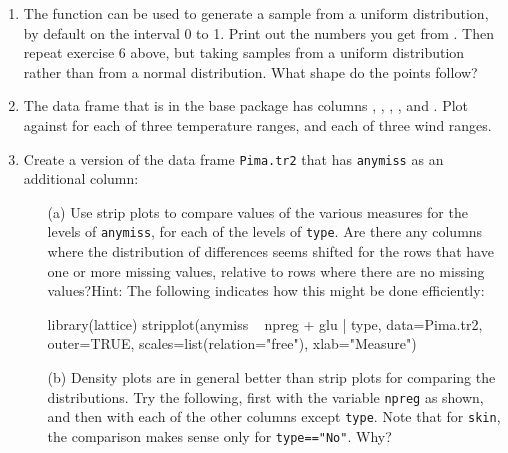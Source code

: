 \begin{enumerate}
\item The function  can be used to generate a sample
  from a uniform distribution, by default on the interval 0 to
  1. Print out the numbers you get from . Then repeat exercise 6 above, but taking samples from
  a uniform distribution rather than from a normal distribution.  What
  shape do the points follow?

\item The data frame  that is in the base package has
  columns , , ,
  ,  and . Plot
   against  for each of three
  temperature ranges, and each of three wind ranges.
\item Create a version of the data frame \texttt{Pima.tr2} that has
  \texttt{anymiss} as an additional column:
\begin{Schunk}
\end{Schunk}
\begin{itemize}
\item[(a)] Use strip plots to compare values of the various measures for
the levels of \texttt{anymiss}, for each of the levels of \texttt{type}.
  Are there any columns where the distribution of differences seems
  shifted for the rows that have one or more missing values, relative
  to rows where there are no missing values?\newline Hint: The
  following indicates how this might be done efficiently:
\begin{fullwidth}

\begin{Schunk}
\begin{Sinput}
library(lattice)
stripplot(anymiss ~ npreg + glu | type, data=Pima.tr2, outer=TRUE,
          scales=list(relation="free"), xlab="Measure")
\end{Sinput}
\end{Schunk}

\end{fullwidth}
\item[(b)] Density plots are in general better than strip plots for
  comparing the distributions. Try the following, first with the
  variable \texttt{npreg} as shown, and then with each of the other
  columns except \texttt{type}. Note that for \texttt{skin}, the comparison
  makes sense only for \texttt{type=="No"}. Why?
\begin{fullwidth}


\end{fullwidth}
\end{itemize}
\end{enumerate}

